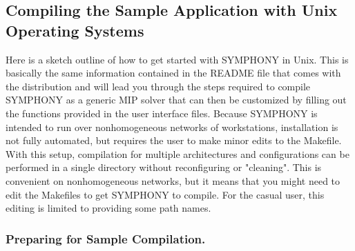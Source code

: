 
\subsection{Compiling the Sample Application with Unix Operating Systems}
\label{getting_started_unix}

Here is a sketch outline of how to get started with SYMPHONY in Unix. This is
basically the same information contained in the README file that comes with
the distribution and will lead you through the steps required to compile
SYMPHONY as a generic MIP solver that can then be customized by filling out
the functions provided in the user interface files. Because SYMPHONY is
intended to run over nonhomogeneous networks of workstations, installation is
not fully automated, but requires the user to make minor edits to the
Makefile.  With this setup, compilation for multiple architectures and
configurations can be performed in a single directory without reconfiguring or
"cleaning". This is convenient on nonhomogeneous networks, but it means that
you might need to edit the Makefiles to get SYMPHONY to compile. For the casual
user, this editing is limited to providing some path names.

\subsubsection{Preparing for Sample Compilation.}

